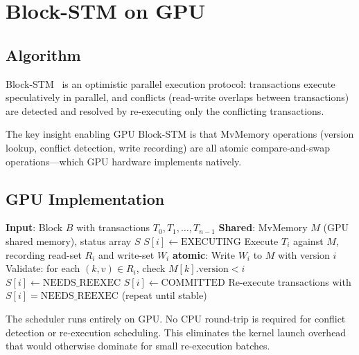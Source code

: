 \section{Block-STM on GPU}

\label{sec:blockstm}

\subsection{Algorithm}

Block-STM~\cite{blockstm} is an optimistic parallel execution protocol: transactions
execute speculatively in parallel, and conflicts (read-write overlaps between transactions)
are detected and resolved by re-executing only the conflicting transactions.

The key insight enabling GPU Block-STM is that MvMemory operations (version lookup,
conflict detection, write recording) are all atomic compare-and-swap operations---which
GPU hardware implements natively.

\subsection{GPU Implementation}

\begin{algorithm}[h]
\caption{GPU Block-STM (simplified)}
\begin{algorithmic}[1]
\State \textbf{Input}: Block $B$ with transactions $T_0, T_1, \ldots, T_{n-1}$
\State \textbf{Shared}: MvMemory $M$ (GPU shared memory), status array $S$
    \State $S[i] \gets \text{EXECUTING}$
    \State Execute $T_i$ against $M$, recording read-set $R_i$ and write-set $W_i$
    \State \textbf{atomic}: Write $W_i$ to $M$ with version $i$
    \State Validate: for each $(k,v) \in R_i$, check $M[k].\text{version} < i$
        \State $S[i] \gets \text{NEEDS\_REEXEC}$
    \Else
        \State $S[i] \gets \text{COMMITTED}$
    \EndIf
\EndFor
\State Re-execute transactions with $S[i] = \text{NEEDS\_REEXEC}$ (repeat until stable)
\end{algorithmic}
\end{algorithm}

The scheduler runs entirely on GPU. No CPU round-trip is required for conflict detection
or re-execution scheduling. This eliminates the kernel launch overhead that would otherwise
dominate for small re-execution batches.

